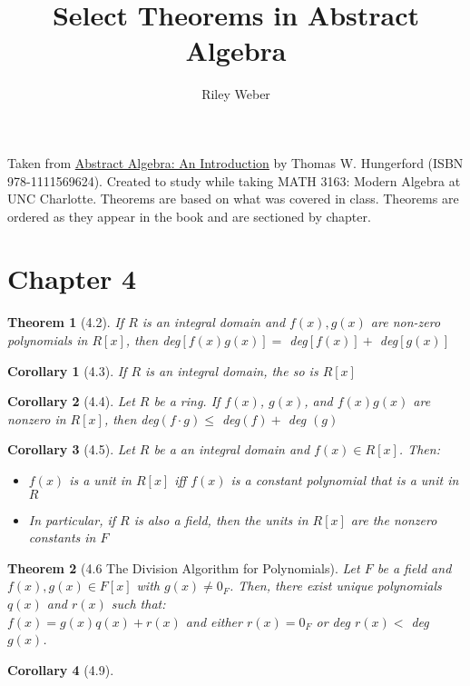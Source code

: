 \documentclass{article}
\theoremstyle{break}
\newtheorem*{theorem*}{Theorem}
\newtheorem*{corollary*}{Corollary}
\begin{document}
\title{Select Theorems in Abstract Algebra}
\author{Riley Weber}
\maketitle

Taken from \underline{Abstract Algebra: An Introduction} by Thomas W.
Hungerford (ISBN 978-1111569624). Created to study while taking MATH 3163:
Modern Algebra at UNC Charlotte. Theorems are based on what was covered in
class. Theorems are ordered as they appear in the book and are sectioned by
chapter.

\section*{Chapter 4}
\begin{theorem*}[4.2]
  If $R$ is an integral domain and $f(x), g(x)$ are non-zero polynomials in
  $R[x]$, then deg$[f(x)g(x)] = $ deg$[f(x)] +$ deg$[g(x)]$
\end{theorem*}

\begin{corollary*}[4.3]
  If $R$ is an integral domain, the so is $R[x]$
\end{corollary*}

\begin{corollary*}[4.4]
  Let $R$ be a ring. If $f(x)$, $g(x)$, and $f(x)g(x)$ are nonzero in $R[x]$,
  then deg$(f \cdot g) \leq $ deg$(f) + $ deg $(g)$
\end{corollary*}

\begin{corollary*}[4.5]
  Let $R$ be a an integral domain and $f(x) \in R[x]$. Then:
  \begin{itemize}
    \item $f(x)$ is a unit in $R[x]$ iff $f(x)$ is a constant polynomial that
    is a unit in $R$
    \item In particular, if $R$ is also a field, then the units in $R[x]$ are
    the nonzero constants in $F$
  \end{itemize}
\end{corollary*}

\begin{theorem*}[4.6 The Division Algorithm for Polynomials]
  Let $F$ be a field and $f(x), g(x) \in F[x]$ with $g(x) \neq 0_F$. Then,
  there exist unique polynomials $q(x)$ and $r(x)$ such that: \\
  $f(x) = g(x)q(x) + r(x)$ and either $r(x) = 0_F$ or deg $r(x) <$ deg $g(x)$. 
\end{theorem*}

\begin{corollary*}[4.9]
\end{corollary*}

\end{document}
